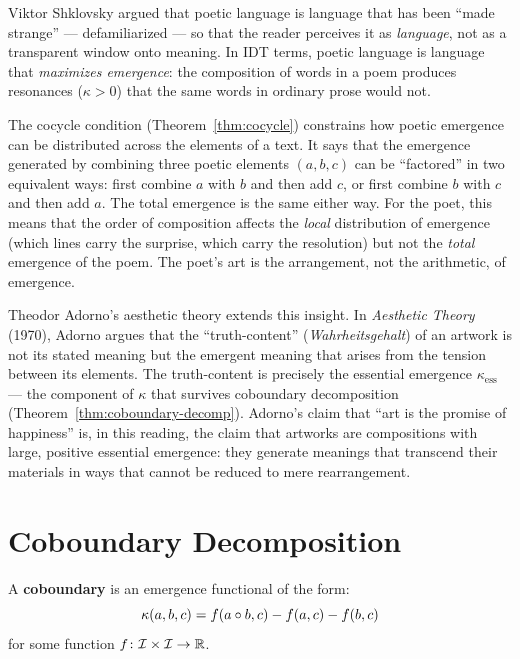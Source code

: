 \begin{interpretation}
\label{interp:ch19:shklovsky_poetic_language}
Viktor Shklovsky argued that poetic language is language that has been
``made strange'' --- defamiliarized --- so that the reader perceives it as
\emph{language}, not as a transparent window onto meaning.  In IDT terms,
poetic language is language that \emph{maximizes emergence}: the
composition of words in a poem produces resonances ($\kappa > 0$) that
the same words in ordinary prose would not.

The cocycle condition (Theorem~\ref{thm:cocycle}) constrains how poetic
emergence can be distributed across the elements of a text.  It says that
the emergence generated by combining three poetic elements $(a, b, c)$
can be ``factored'' in two equivalent ways: first combine $a$ with $b$
and then add $c$, or first combine $b$ with $c$ and then add $a$.  The
total emergence is the same either way.  For the poet, this means that
the order of composition affects the \emph{local} distribution of
emergence (which lines carry the surprise, which carry the resolution)
but not the \emph{total} emergence of the poem.  The poet's art is the
arrangement, not the arithmetic, of emergence.

Theodor Adorno's aesthetic theory extends this insight.  In
\textit{Aesthetic Theory} (1970), Adorno argues that the ``truth-content''
(\textit{Wahrheitsgehalt}) of an artwork is not its stated meaning but
the emergent meaning that arises from the tension between its elements.
The truth-content is precisely the essential emergence $\kappa_{\text{ess}}$
--- the component of $\kappa$ that survives coboundary decomposition
(Theorem~\ref{thm:coboundary-decomp}).  Adorno's claim that ``art is the
promise of happiness'' is, in this reading, the claim that artworks are
compositions with large, positive essential emergence: they generate
meanings that transcend their materials in ways that cannot be reduced to
mere rearrangement.
\end{interpretation}

\section{Coboundary Decomposition}

\begin{definition}[Coboundary]
\label{def:coboundary}
A \textbf{coboundary} is an emergence functional of the form:
\[
  \kappa(a, b, c) = f(a \circ b, c) - f(a, c) - f(b, c)
\]
for some function $f\colon \mathcal{I} \times \mathcal{I} \to \mathbb{R}$.
\end{definition}

